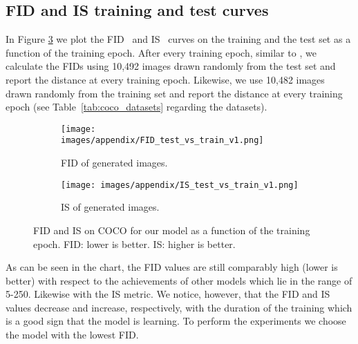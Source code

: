 \documentclass[a4paper,12pt]{report}
\begin{document}
\subsection{FID and IS training and test curves}\label{sec:train_vs_test_FID}
In Figure \ref{fig:fid_is_metrics} we plot the FID~\cite{TTUR} and IS~\cite{ImprTechn4TrainGANs} curves on the training and the test set as a function of the training epoch. After every training epoch, similar to \cite{StyleGAN}, we calculate the FIDs using 10,492 images drawn randomly from the test set and report the distance at every training epoch. Likewise, we use 10,482 images drawn randomly from the training set and report the distance at every training epoch (see Table~\ref{tab:coco_datasets} regarding the datasets). 
\begin{figure}[h]
\centering
\begin{subfigure}{0.49\textwidth}
\texttt{[image: images/appendix/FID\_test\_vs\_train\_v1.png]}
\caption{FID of generated images.}
\label{fig:fid_test_train}
\end{subfigure}
\begin{subfigure}{0.49\textwidth}
\texttt{[image: images/appendix/IS\_test\_vs\_train\_v1.png]}
\caption{IS of generated images.}
\label{fig:is_test_train}
\end{subfigure}
\caption[FID and IS on COCO for our model.]{FID and IS on COCO for our model as a function of the training epoch. FID: lower is better. IS: higher is better.}
\label{fig:fid_is_metrics}
\end{figure}
As can be seen in the chart, the FID values are still comparably high (lower is better) with respect to the achievements of other models which lie in the range of 5-250. Likewise with the IS metric. We notice, however, that the FID and IS values decrease and increase, respectively, with the duration of the training which is a good sign that the model is learning. To perform the experiments we choose the model with the lowest FID.



\end{document}
